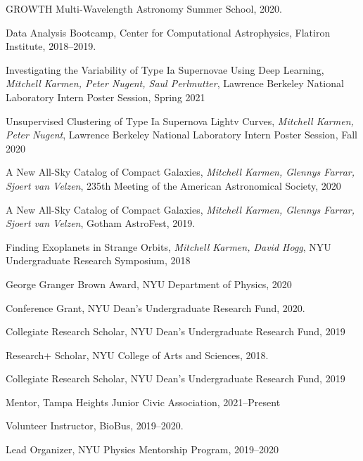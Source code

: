 \documentclass[12pt,letterpaper]{article}
\begin{document}
\begin{list}{}{\cvlist}

\item
  GROWTH Multi-Wavelength Astronomy Summer School, 2020.


\item
  Data Analysis Bootcamp, Center for Computational Astrophysics, Flatiron Institute, 2018--2019.

\end{list}

\begin{list}{}{\cvlist}

\item
  Investigating the Variability of Type Ia Supernovae Using Deep Learning, \textit{Mitchell Karmen, Peter Nugent, Saul Perlmutter}, Lawrence Berkeley National Laboratory Intern Poster Session, Spring 2021
\item
  Unsupervised Clustering of Type Ia Supernova Lightv Curves, \textit{Mitchell Karmen, Peter Nugent}, Lawrence Berkeley National Laboratory Intern Poster Session, Fall 2020

\item
  A New All-Sky Catalog of Compact Galaxies, \textit{Mitchell Karmen, Glennys Farrar, Sjoert van Velzen}, 235th Meeting of the American Astronomical Society, 2020

\item
  A New All-Sky Catalog of Compact Galaxies, \textit{Mitchell Karmen, Glennys Farrar, Sjoert van Velzen}, Gotham AstroFest, 2019.

\item
  Finding Exoplanets in Strange Orbits, \textit{Mitchell Karmen, David Hogg}, NYU Undergraduate Research Symposium, 2018

\end{list}


\begin{list}{}{\cvlist}

\item
  George Granger Brown Award, NYU Department of Physics, 2020

\item
  Conference Grant, NYU Dean's Undergraduate Research Fund, 2020.

\item
  Collegiate Research Scholar, NYU Dean's Undergraduate Research Fund, 2019

\item
  Research+ Scholar, NYU College of Arts and Sciences, 2018.

\item
  Collegiate Research Scholar, NYU Dean's Undergraduate Research Fund, 2019

\end{list}


\begin{list}{}{\cvlist}

\item
  Mentor, Tampa Heights Junior Civic Association, 2021--Present

\item
  Volunteer Instructor, BioBus, 2019--2020.

\item
  Lead Organizer, NYU Physics Mentorship Program, 2019--2020

\end{list}
\end{document}
